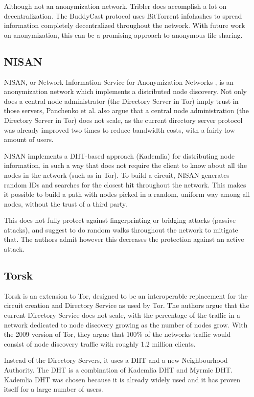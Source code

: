 \documentclass{article}
\begin{document}
		Although not an anonymization network, Tribler does accomplish a lot on decentralization. The BuddyCast protocol uses BitTorrent infohashes to spread information completely decentralized throughout the network. With future work on anonymization, this can be a promising approach to anonymous file sharing.

	\subsection{NISAN} %
		NISAN, or Network Information Service for Anonymization Networks \cite{panchenko2006nisan}, is an anonymization network which implements a distributed node discovery. Not only does a central node administrator (the Directory Server in Tor) imply trust in those servers, Panchenko et al. also argue that a central node administration (the Directory Server in Tor) does not scale, as the current directory server protocol was already improved two times to reduce bandwidth costs, with a fairly low amount of users.
		
		NISAN implements a DHT-based approach (Kademlia) for distributing node information, in such a way that does not require the client to know about all the nodes in the network (such as in Tor). To build a circuit, NISAN generates random IDs and searches for the closest hit throughout the network. This makes it possible to build a path with nodes picked in a random, uniform way among all nodes, without the trust of a third party.
		
		This does not fully protect against fingerprinting or bridging attacks (passive attacks), and suggest to do random walks throughout the network to mitigate that. The authors admit however this decreases the protection against an active attack.
		
	\subsection{Torsk} %
		Torsk \cite{mclachlan2009scalable} is an extension to Tor, designed to be an interoperable replacement for the circuit creation and Directory Service as used by Tor. The authors argue that the current Directory Service does not scale, with the percentage of the traffic in a network dedicated to node discovery growing as the number of nodes grow. With the 2009 version of Tor, they argue that 100\% of the networks traffic would consist of node discovery traffic with roughly 1.2 million clients. 
		
		Instead of the Directory Servers, it uses a DHT and a new Neighbourhood Authority. The DHT is a combination of Kademlia DHT and Myrmic DHT. Kademlia DHT was chosen because it is already widely used and it has proven itself for a large number of users.
		
\end{document}
